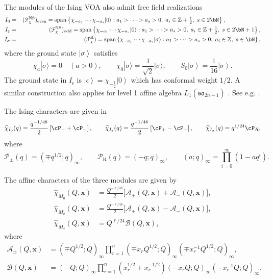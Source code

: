 \documentclass[a4paper,11pt]{article}
\theoremstyle{definition}
\theoremstyle{definition}
\theoremstyle{remark}
\newcommand{\ket}[1]{\ensuremath{\left|#1\right\rangle}}
\newcommand{\be}{\begin{equation}}
\newcommand{\ee}{\end{equation}}
\newcommand{\beqn}{\begin{eqnarray}}
\newcommand{\eeqn}{\end{eqnarray}}
\begin{document}
 The modules of the Ising VOA also admit free field realizations
\beqn  
I_0%
&=&(\mathcal F_\chi^{\mathrm{NS}})_{\mathrm{even}}
=\operatorname{span}\left\{
\chi_{-a_1}\cdots\chi_{-a_s}|0\rangle:
 a_1>\cdots>a_s>0,\; a_i\in\mathbb Z+\tfrac12, \; s\in 2\bN
\right\},
\qquad\qquad \qquad\\  
I_\varepsilon%
&=&(\mathcal F_\chi^{\mathrm{NS}})_{\mathrm{odd}}
=\operatorname{span}\left\{
\chi_{-a_1}\cdots\chi_{-a_s}|0\rangle:
 a_1>\cdots>a_s>0 ,\; a_i\in\mathbb Z+\tfrac12, \; s\in 2\bN+1 
 \right\},
   \\  
 I_\sigma%
&=&(\mathcal F_\chi^{\mathrm{R}}) 
=\operatorname{span}\left\{
\chi_{-a_1}\cdots\chi_{-a_s}|\sigma\rangle:
 a_1>\cdots>a_s>0,\; a_i\in\mathbb Z , \; s\in  \bN 
 \right\},
 \eeqn  
 where the ground state $\ket{\sigma}$  satisfies
\be
\chi_a|\sigma\rangle=0\quad(a>0),\qquad
\chi_0|\sigma\rangle=\frac1{\sqrt2}|\sigma\rangle,\qquad
S_0 \ket{\sigma}=\frac{1}{16}\ket{\sigma}.
\ee
The ground state in $I_\epsilon $ is $\ket{\epsilon}  =\chi_{-\frac12}\ket{0}$ which has conformal weight $1/2$.
A similar construction also applies for level 1 affine algebra $L_1(\mathfrak{so}_{2n+1})$  \cite{Ginsparg:1988ui}.  See e.g. \cite{Bockenhauer:1995hx}.


The Ising characters  are given in  \cite{Ginsparg:1988ui}
\be\label{eq:Isingcharacters} 
\widehat\chi_{I_0}(q)=\frac{q^{-1/48}}2\left[ \cP_++\cP_-\right],\qquad
\widehat\chi_{I_\varepsilon}(q)=\frac{q^{-1/48}}2\left[ \cP_+-\cP_-\right], \qquad
\widehat\chi_{I_\sigma}(q) =q^{1/24}\cP_R,
\ee
where 
\be
\mathcal P_\pm(q) =(\mp q^{1/2};q)_\infty,\qquad
\mathcal P_{\mathrm R}(q)=(-q;q)_\infty, \qquad (a;q)_\infty =\prod_{i=0}^\infty(1-a q^i).
\ee


 The affine   characters of the three modules are given by  \cite{Delmastro:2021otj}
\be\label{eq:Bn-level-one-flavored-characters}
\begin{aligned}
\widehat\chi_{M_0}(Q,\bm x)
&=\frac{Q^{-\ell/48}}{2}\bigl[\mathcal A_+(Q,\bm x)+\mathcal A_-(Q,\bm x)\bigr],\\
\widehat\chi_{M_v}(Q,\bm x)
&=\frac{Q^{-\ell/48}}{2}\bigl[\mathcal A_+(Q,\bm x)-\mathcal A_-(Q,\bm x)\bigr],\\
\widehat\chi_{M_s}(Q,\bm x)&=Q^{\ell/24}\mathcal B(Q,\bm x),
\end{aligned}
\ee
where
\be\label{eq:Bn-flavored-fermion-products}
\begin{aligned}
\mathcal A_\pm(Q,\bm x)
&=(\mp Q^{1/2};Q)_\infty
\prod_{r=1}^{n}(\mp x_rQ^{1/2};Q)_\infty (\mp x_r^{-1}Q^{1/2};Q)_\infty,\\
\mathcal B(Q,\bm x)
&=(-Q;Q)_\infty\prod_{r=1}^{n}
(x_r^{1/2}+x_r^{-1/2})(-x_rQ;Q)_\infty(-x_r^{-1}Q;Q)_\infty.
\end{aligned}
\ee
 
\end{document}
